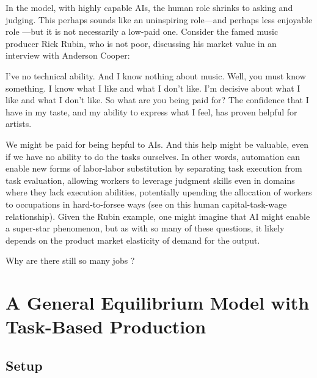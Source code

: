 \documentclass{article}
\theoremstyle{plain}
\theoremstyle{plain}
\begin{document}
In the model, with highly capable AIs, the human role shrinks to asking and judging. 
This perhaps sounds like an uninspiring role---and perhaps less enjoyable role \citep{toner2024artificial}---but it is not necessarily a low-paid one. 
Consider the famed music producer Rick Rubin, who is not poor, discussing his market value in an interview with Anderson Cooper:
\begin{dialogue}
     I've no technical ability. And I know nothing about music.
     Well, you must know something.
     I know what I like and what I don't like. I'm decisive about what I like and what I don't like.
     So what are you being paid for?
     The confidence that I have in my taste, and my ability to express what I feel, has proven helpful for artists.
\end{dialogue}
We might be paid for being hepful to AIs.
And this help might be valuable, even if we have no ability to do the tasks ourselves.
In other words, automation can enable new forms of labor-labor substitution by separating task execution from task evaluation, allowing workers to leverage judgment skills even in domains where they lack execution abilities, potentially upending the allocation of workers to occupations in hard-to-forsee ways (see \cite{autor2013putting} on this human capital-task-wage relationship).
Given the Rubin example, one might imagine that AI might enable a super-star phenomenon, but as with so many of these questions, it likely depends on the product market elasticity of demand for the output.



Why are there still so many jobs \citep{autor2015}?


\section{A General Equilibrium Model with Task-Based Production}

\subsection{Setup}
\end{document}
